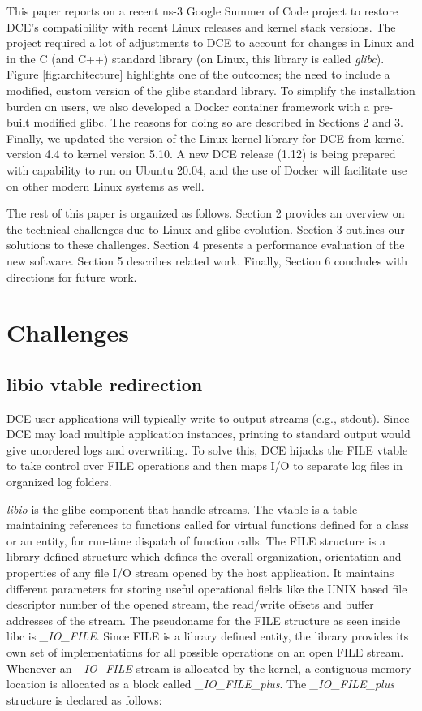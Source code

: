 \documentclass{sig-alternate}
\begin{document}
This paper reports on a recent ns-3 Google Summer of Code project to restore
DCE's compatibility with
recent Linux releases and kernel stack versions.  The project required
a lot of adjustments to DCE to account for changes in Linux and in the
C (and C++) standard library (on Linux, this library is called \emph{glibc}).
Figure \ref{fig:architecture} highlights one of the outcomes; the need to
include a modified, custom version of the glibc standard library.  To
simplify the installation burden on users, we also developed a Docker
container framework with a pre-built modified glibc.  The reasons for
doing so are described in Sections 2 and 3.  Finally, we updated the
version of the Linux kernel library for DCE from kernel version 4.4 
to kernel version 5.10.  A new DCE release (1.12) is being prepared with
capability to run on Ubuntu 20.04, and the use of Docker will facilitate
use on other modern Linux systems as well.

The rest of this paper is organized as follows.  Section 2 provides an
overview on the technical challenges due to Linux and glibc evolution.
Section 3 outlines our solutions to these challenges.
Section 4 presents a performance evaluation of the new software.
Section 5 describes related work.
Finally, Section 6 concludes with directions for future work.

\section{Challenges}

\subsection{libio vtable redirection}
DCE user applications will typically write to output streams (e.g., stdout).
Since DCE may
load multiple application instances, printing to standard output
would give unordered logs and overwriting.
To solve this, DCE hijacks the FILE vtable to take control over FILE operations and then maps I/O to separate log files in organized log folders.

 \emph{libio} is the glibc component that handle streams.  
The vtable is a table maintaining references to functions called for virtual functions defined for a class or an entity, for run-time dispatch of function calls. 
The FILE structure is a library defined structure which defines the overall organization, 
orientation and properties of any file I/O stream opened
by the host application. It maintains different parameters for storing useful operational fields like the UNIX based file descriptor number of the 
opened stream, the read/write offsets and buffer addresses of the stream. The pseudoname for the FILE structure as seen inside libc is \textit{\_IO\_FILE}. 
Since FILE is a library defined entity, the library provides its own set of implementations for all possible operations on an open FILE stream.
Whenever an \textit{\_IO\_FILE} stream is allocated by the kernel, a contiguous memory location is allocated as a block called \textit{\_IO\_FILE\_plus}. 
The \textit{\_IO\_FILE\_plus} structure is declared as follows:
\end{document}
